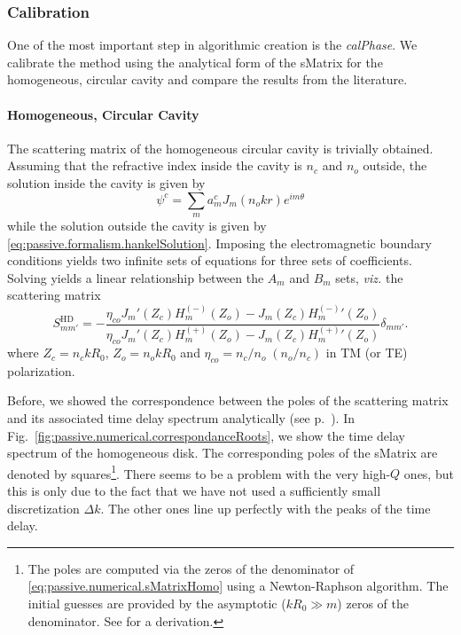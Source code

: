 \subsubsection{Calibration}
One of the most important step in algorithmic creation
is the \textit{\gls{calPhase}}. We calibrate the method
using the analytical form of the \gls{sMatrix} for the
homogeneous, circular cavity and compare the results 
from the literature. 

\paragraph{Homogeneous, Circular Cavity}
The scattering matrix of the homogeneous circular cavity
is trivially obtained. Assuming that the refractive index inside
the cavity is $n_c$ and $n_o$ outside, the solution inside the 
cavity is given by 
  \begin{equation}
   \psi^c = \sum_m a_m^cJ_m(n_okr)e^{im\theta}
  \end{equation}
while the solution outside the cavity is given by \eqref{eq:passive.formalism.hankelSolution}.
Imposing the electromagnetic boundary conditions yields two infinite sets of equations
for three sets of coefficients. Solving yields a linear relationship between the 
$A_m$ and $B_m$ sets, \textit{viz.} the scattering matrix
  \begin{equation}
   \label{eq:passive.numerical.sMatrixHomo}
   S_{mm'}^\text{HD} = -  \frac{\eta_{co}J_m'(Z_c)H_m^{(-)}(Z_o)-J_m(Z_c){H^{(-)}_m}'(Z_o)}
				{\eta_{co}J_m'(Z_c)H_m^{(+)}(Z_o)-J_m(Z_c){H^{(+)}_m}'(Z_o)}\delta_{mm'}.
  \end{equation}
where $Z_c = n_ckR_0$, $Z_o=n_okR_0$ and $\eta_{co}= n_c/n_o\; (n_o/n_c)$ in TM (or TE) polarization.

Before, we showed the correspondence between the poles of the scattering matrix and its associated
time delay spectrum analytically (see p.~\pageref{eq:passive.formalism.lorentzianDelays}). 
In Fig.~\ref{fig:passive.numerical.correspondanceRoots}, we show the
time delay spectrum of the homogeneous disk. The corresponding poles of the \gls{sMatrix} are denoted
by squares\footnote{The poles are computed via the zeros of the denominator of \eqref{eq:passive.numerical.sMatrixHomo}
using a Newton-Raphson algorithm. The initial guesses are provided by the asymptotic ($kR_0\gg m$) zeros
of the denominator. See \cite[Annexe A.2.4]{GAG2011} for a derivation.}. There seems to be a problem with the very high-$Q$ ones, but this is only due to the fact
that we have not used a sufficiently small discretization $\Delta k$. The other ones line up perfectly with the peaks
of the time delay. 

